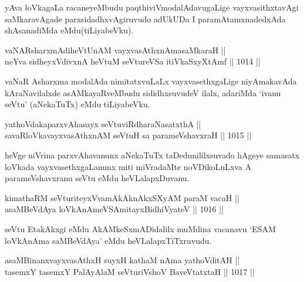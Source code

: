 \begin{artha}
yAva loVkagaLa racaneyeMbudu paqthiviVmodalAdavugaLige vayxvasithxtavAgi saMkaravAgade parxsidadhxvAgiruvudo adUkUDa I paramAtamxnadedxAda shAsanadiMda eMdu(tiLiyabeVku).
\end{artha}


\begin{shl}
vaNARsharxmAdiheVtUnAM vayxvasAthxnAmasaMkaraH || \\
neYva sidheyxVdivxnA heVtuM seVtureVSa itiVkaSxyXtAmf \hfill || 1014 ||  
\end{shl}

\begin{artha}
vaNaR Asharxma modalAda nimitatxvuLaLx vayxvasethxgaLige niyAmakavAda kAraNavilalxde asAMkayaRveMbudu sididhxsuvudeV ilalx, adariMda `ivanu seVtu' (aNekaTuTx) eMdu tiLiyabeVku.
\end{artha}


\begin{shl}
yathoVdakaparxvAhasayx seVtuviRdharaNasatxthA || \\
savaRloVkavayxvasAthxnAM seVtuH sa parameVshavxraH \hfill || 1015 ||  
\end{shl}

\begin{artha}
heVge niVrina parxvAhavanunx aNekaTuTx taDedunililxsuvado hAgeye samasatx loVkada vayxvasethxgaLanunx miti miVradaMte noVDikoLuLxva A parameVshavxranu seVtu eMdu heVLalapxDuvanu.
\end{artha}

\begin{shl}
kimathaRM seVturiteyxVvamAkAknAkxSXyAM paraM vacaH || \\
asaMBeVdAya loVkAnAmeVSAmitayxBidhiVyateV \hfill || 1016 ||  
\end{shl}

\begin{artha}
seVtu EtakAkxgi eMdu AkAMkeSxmADidalilx muMdina vacanavu `ESAM loVkAnAma saMBeVdAya' eMdu heVLalapxTiTxruvudu.
\end{artha}

\begin{shl}
asaMBinanxvayxvasAthxH suyxH kathaM nAma yathoVditAH || \\
tasemxY tasemxY PalAyAlaM seVturiVshoV BaveVtatxtaH \hfill || 1017 ||  
\end{shl}

